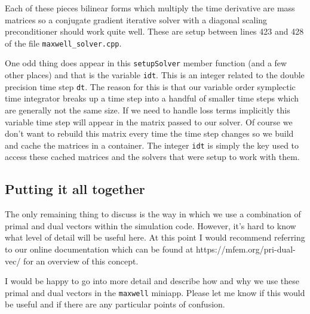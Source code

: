 \documentclass[12pt]{article}
\begin{document}
Each of these pieces bilinear forms which multiply the time derivative
are mass matrices so a conjugate gradient iterative solver with a
diagonal scaling preconditioner should work quite well. These are
setup between lines 423 and 428 of the file {\tt maxwell\_solver.cpp}.

One odd thing does appear in this {\tt setupSolver} member function
(and a few other places) and that is the variable {\tt idt}. This is
an integer related to the double precision time step {\tt dt}. The
reason for this is that our variable order symplectic time integrator
breaks up a time step into a handful of smaller time steps which are
generally not the same size. If we need to handle loss terms implicitly
this variable time step will appear in the matrix passed to our
solver. Of course we don't want to rebuild this matrix every time the
time step changes so we build and cache the matrices in a
container. The integer {\tt idt} is simply the key used to access
these cached matrices and the solvers that were setup to work with
them.

\subsection{Putting it all together}

The only remaining thing to discuss is the way in which we use a
combination of primal and dual vectors within the simulation
code. However, it's hard to know what level of detail will be useful
here. At this point I would recommend referring to our online
documentation which can be found at https://mfem.org/pri-dual-vec/ for
an overview of this concept.

I would be happy to go into more detail and describe how and why we
use these primal and dual vectors in the {\tt maxwell} miniapp. Please
let me know if this would be useful and if there are any particular
points of confusion.
\end{document}
